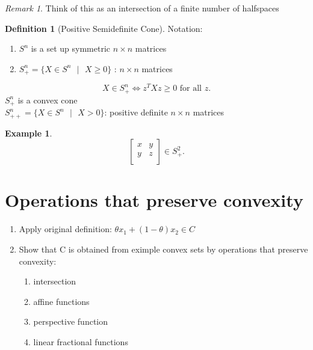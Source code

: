 \documentclass{report}
\theoremstyle{remark} \newtheorem{remark}{Remark}[section]
\theoremstyle{definition}
\newtheorem{definition}{Definition}[section]
\theoremstyle{definition}
\newtheorem{example}{Example}[section]
\theoremstyle{definition}
\theoremstyle{remark}
\begin{document}
\begin{remark}
    Think of this as an intersection of a finite number of halfspaces   
\end{remark}

\begin{definition}[Positive Semidefinite Cone]
    Notation:
    \begin{enumerate}
        \item $S^{n}$ is a set up symmetric $n \times n$ matrices
    \item $S_+^{n} = \{X \in S^{n} \text{ } | \text{ } X \ge  0\}$ : $n \times n$ matrices
    \end{enumerate}
    \[
    X \in S_+^{n} \iff z^{T}Xz \ge 0 \text{ for all $z$}
    .\] 
      $S_{+}^n$ is a convex cone \\
      $S_{++}^{n} = \{X \in S^{n} \text{ }| \text{ }X > 0\}$: positive definite $n \times n$ matrices
\end{definition}

\begin{example}
    \[
\begin{bmatrix}
    x & y \\
    y & z \\
\end{bmatrix}
\in S_+^{2}
    .\] 
\end{example}

\section{Operations that preserve convexity}

\begin{enumerate}
    \item Apply original definition: $\theta x_1 + (1-\theta)x_2 \in C$  
   \item Show that C is obtained from eximple convex sets by operations that preserve convexity:
       \begin{enumerate}
           \item intersection
               \item  affine functions
                   \item  perspective function
                       \item linear fractional functions
           
       \end{enumerate}
\end{enumerate}
\end{document}

